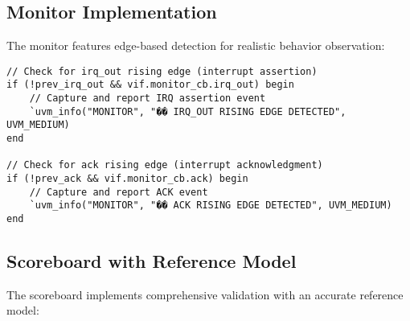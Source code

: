 \documentclass[12pt,a4paper]{article}
\begin{document}
\subsection{Monitor Implementation}
The monitor features edge-based detection for realistic behavior observation:

\begin{lstlisting}[caption=Edge-Based Monitor Logic]
// Check for irq_out rising edge (interrupt assertion)
if (!prev_irq_out && vif.monitor_cb.irq_out) begin
    // Capture and report IRQ assertion event
    `uvm_info("MONITOR", "�� IRQ_OUT RISING EDGE DETECTED", UVM_MEDIUM)
end

// Check for ack rising edge (interrupt acknowledgment)
if (!prev_ack && vif.monitor_cb.ack) begin
    // Capture and report ACK event
    `uvm_info("MONITOR", "�� ACK RISING EDGE DETECTED", UVM_MEDIUM)
end
\end{lstlisting}

\subsection{Scoreboard with Reference Model}
The scoreboard implements comprehensive validation with an accurate reference model:
\end{document}
